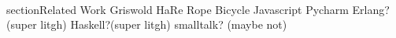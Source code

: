 \\section{Related Work}
\label{sec:Related-Work}
Griswold
HaRe
Rope
Bicycle
Javascript
Pycharm
Erlang?(super litgh)
Haskell?(super litgh)
smalltalk? (maybe not)
